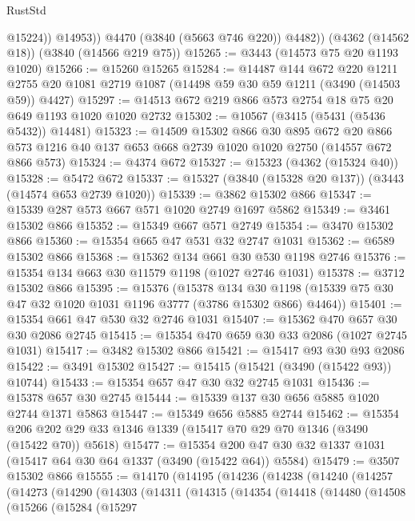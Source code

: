 \begin{lexlean}{RustStd}
\begin{coremodule}
                @15224))
            @14953))
        @4470
        (@3840 (@5663 @746 @220))
        @4482))
    (@4362 (@14562 @18))
    (@3840 (@14566 @219 @75))
@15265 := @3443 (@14573 @75 @20 @1193 @1020)
@15266 := @15260 @15265
@15284 := @14487
    @144
    @672
    @220
    @1211
    @2755
    @20
    @1081
    @2719
    @1087
    (@14498 @59 @30 @59 @1211 (@3490 (@14503 @59)) @4427)
@15297 := @14513 @672 @219 @866 @573 @2754 @18 @75 @20 @649 @1193 @1020 @1020 @2732
@15302 := @10567 (@3415 (@5431 (@5436 @5432)) @14481)
@15323 := @14509
    @15302
    @866
    @30
    @895
    @672
    @20
    @866
    @573
    @1216
    @40
    @137
    @653
    @668
    @2739
    @1020
    @1020
    @2750
    (@14557 @672 @866 @573)
@15324 := @4374 @672
@15327 := @15323 (@4362 (@15324 @40))
@15328 := @5472 @672
@15337 := @15327 (@3840 (@15328 @20 @137)) (@3443 (@14574 @653 @2739 @1020))
@15339 := @3862 @15302 @866
@15347 := @15339 @287 @573 @667 @571 @1020 @2749 @1697 @5862
@15349 := @3461 @15302 @866
@15352 := @15349 @667 @571 @2749
@15354 := @3470 @15302 @866
@15360 := @15354 @665 @47 @531 @32 @2747 @1031
@15362 := @6589 @15302 @866
@15368 := @15362 @134 @661 @30 @530 @1198 @2746
@15376 := @15354 @134 @663 @30 @11579 @1198 (@1027 @2746 @1031)
@15378 := @3712 @15302 @866
@15395 := @15376
    (@15378
      @134
      @30
      @1198
      (@15339 @75 @30 @47 @32 @1020 @1031 @1196 @3777 (@3786 @15302 @866) @4464))
@15401 := @15354 @661 @47 @530 @32 @2746 @1031
@15407 := @15362 @470 @657 @30 @30 @2086 @2745
@15415 := @15354 @470 @659 @30 @33 @2086 (@1027 @2745 @1031)
@15417 := @3482 @15302 @866
@15421 := @15417 @93 @30 @93 @2086
@15422 := @3491 @15302
@15427 := @15415 (@15421 (@3490 (@15422 @93)) @10744)
@15433 := @15354 @657 @47 @30 @32 @2745 @1031
@15436 := @15378 @657 @30 @2745
@15444 := @15339 @137 @30 @656 @5885 @1020 @2744 @1371 @5863
@15447 := @15349 @656 @5885 @2744
@15462 := @15354 @206 @202 @29 @33 @1346 @1339 (@15417 @70 @29 @70 @1346 (@3490 (@15422 @70)) @5618)
@15477 := @15354 @200 @47 @30 @32 @1337 @1031 (@15417 @64 @30 @64 @1337 (@3490 (@15422 @64)) @5584)
@15479 := @3507 @15302 @866
@15555 := @14170
    (@14195
      (@14236
        (@14238
          (@14240
            (@14257
              (@14273
                (@14290
                  (@14303
                    (@14311
                      (@14315
                        (@14354
                          (@14418
                            (@14480
                              (@14508
                                (@15266
                                  (@15284
                                    (@15297

\end{coremodule}
\end{lexlean}
